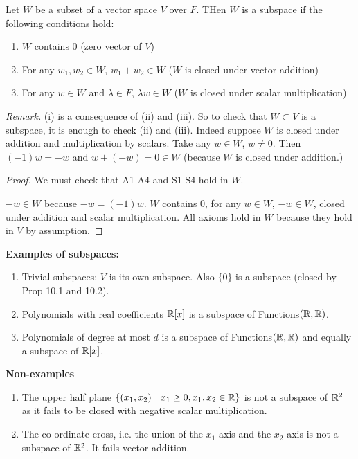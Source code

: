 \documentclass[10pt]{scrartcl}
\begin{document}
\begin{proposition}
Let $W$ be a subset of a vector space $V$ over $F$. THen $W$ is a subspace if the following conditions hold: 
\begin{enumerate}
  \item $W$ contains $0$ (zero vector of $V$)
  \item For any $w_1,w_2 \in W,\, w_1 + w_2 \in W$ ($W$ is closed under vector addition)
  \item For any $w \in W$ and $\lambda \in F$, $\lambda w \in W$ ($W$ is closed under scalar multiplication)
\end{enumerate}
\end{proposition}

\emph{Remark.} (i) is a consequence of (ii) and (iii). So to check that $W \subset V$ is a subspace, it is enough to check (ii) and (iii). Indeed suppose $W$ is closed under addition and multiplication by scalars. Take any $w \in W$, $w \neq 0$. Then $(-1)w = -w$ and $w + (-w) = 0 \in W$ (because $W$ is closed under addition.) 	

\begin{proof}
We must check that A1-A4 and S1-S4 hold in $W$. 

$-w \in W$ because $-w = (-1)w$. $W$ contains $0$, for any $w \in W$, $-w \in W$, closed under addition and scalar multiplication. All axioms hold in $W$ because they hold in $V$ by assumption.	
\end{proof}\vspace*{5pt}

\textbf{Examples of subspaces:}
	\begin{enumerate}
		\item Trivial subspaces: $V$ is its own subspace. Also $\{0\}$ is a subspace (closed by Prop 10.1 and 10.2).
		\item Polynomials with real coefficients $\mathbb{R}[x]$ is a subspace of Functions$(\mathbb{R},\mathbb{R})$. 
		\item Polynomials of degree at most $d$ is a subspace of Functions$(\mathbb{R},\mathbb{R})$ and equally a subspace of $\mathbb{R}[x]$. 
	\end{enumerate}

\textbf{Non-examples}
\begin{enumerate}
\item The upper half plane $\{(x_1,x_2) ~|~ x_1 \geq 0, x_1,x_2 \in\mathbb{R}\}$ is not a subspace of $\mathbb{R}^2$ as it fails to be closed with negative scalar multiplication.
\item The co-ordinate cross, i.e. the union of the $x_1$-axis and the $x_2$-axis is not a subspace of $\mathbb{R}^2$. It fails vector addition.  
\end{enumerate}\vsp
\end{document}
